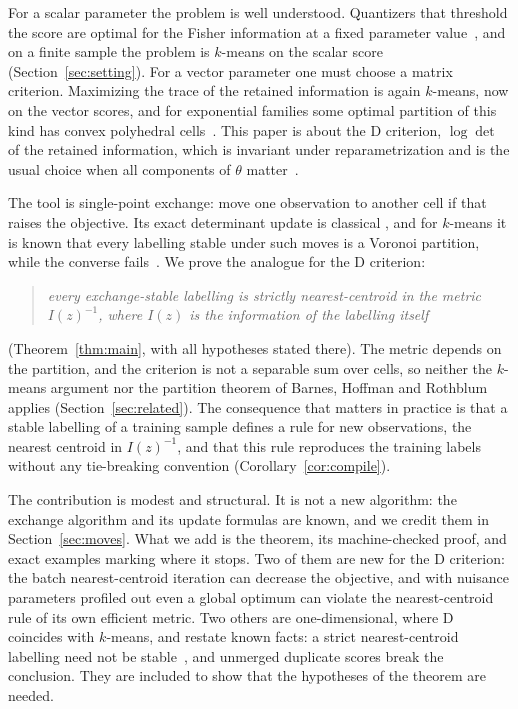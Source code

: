 \documentclass[11pt]{amsart}
\theoremstyle{definition}
\theoremstyle{remark}
\newcommand{\Ib}{I(z)}
\begin{document}
For a scalar parameter the problem is well understood. Quantizers that threshold the score are
optimal for the Fisher information at a fixed parameter value~\cite{venkitasubramaniam2006,venkitasubramaniam2007}, and on a finite
sample the problem is $k$-means on the scalar score (Section~\ref{sec:setting}). For a vector
parameter one must choose a matrix criterion. Maximizing the trace of the retained information is
again $k$-means, now on the vector scores, and for exponential families some optimal partition
of this kind has convex polyhedral cells~\cite{dulek2023}. This paper is about the D criterion, $\log\det$ of the retained
information, which is invariant under reparametrization and is the usual choice when all
components of $\theta$ matter~\cite{karlin1966}.

The tool is single-point exchange: move one observation to another cell if that raises the
objective. Its exact determinant update is classical
\cite{banfield1977,fedorov1972,mitchell1974,cook1980}, and for $k$-means it is known that every
labelling stable under such moves is a Voronoi partition, while the converse
fails~\cite{telgarsky2010}. We prove the analogue for the D criterion:

\begin{quote}
\emph{every exchange-stable labelling is strictly nearest-centroid in the metric $\Ib^{-1}$,
where $\Ib$ is the information of the labelling itself}
\end{quote}
(Theorem~\ref{thm:main}, with all hypotheses stated there). The metric depends on the partition,
and the criterion is not a separable sum over cells, so neither the $k$-means argument nor the
partition theorem of Barnes, Hoffman and Rothblum~\cite{barnes1992} applies
(Section~\ref{sec:related}). The consequence that matters in practice is that a stable labelling
of a training sample defines a rule for new observations, the nearest centroid in $\Ib^{-1}$,
and that this rule reproduces the training labels without any tie-breaking convention
(Corollary~\ref{cor:compile}).

The contribution is modest and structural. It is not a new algorithm: the exchange algorithm and
its update formulas are known, and we credit them in Section~\ref{sec:moves}. What we add is the
theorem, its machine-checked proof, and exact examples marking where it stops. Two of them are
new for the D criterion: the batch nearest-centroid iteration can decrease the objective, and
with nuisance parameters profiled out even a global optimum can violate the nearest-centroid
rule of its own efficient metric. Two others are one-dimensional, where D coincides with
$k$-means, and restate known facts: a strict nearest-centroid labelling need not be
stable~\cite{telgarsky2010}, and unmerged duplicate scores break the conclusion. They are
included to show that the hypotheses of the theorem are needed.
\end{document}

